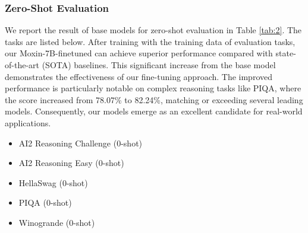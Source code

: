 \subsubsection{Zero-Shot Evaluation}

We report the result of base models for zero-shot evaluation in Table \ref{tab:2}. The tasks are listed below. After training with the training data of evaluation tasks, our Moxin-7B-finetuned can achieve superior performance compared with state-of-the-art (SOTA) baselines. This significant increase from the base model demonstrates the effectiveness of our fine-tuning approach. The improved performance is particularly notable on complex reasoning tasks like PIQA, where the score increased from 78.07\% to 82.24\%, matching or exceeding several leading models.
Consequently, our models emerge as an excellent candidate for real-world applications. 
\begin{itemize}
\item AI2 Reasoning Challenge (0-shot)
\item AI2 Reasoning Easy (0-shot)
\item HellaSwag (0-shot)
\item PIQA (0-shot)
\item Winogrande (0-shot)
\end{itemize}

